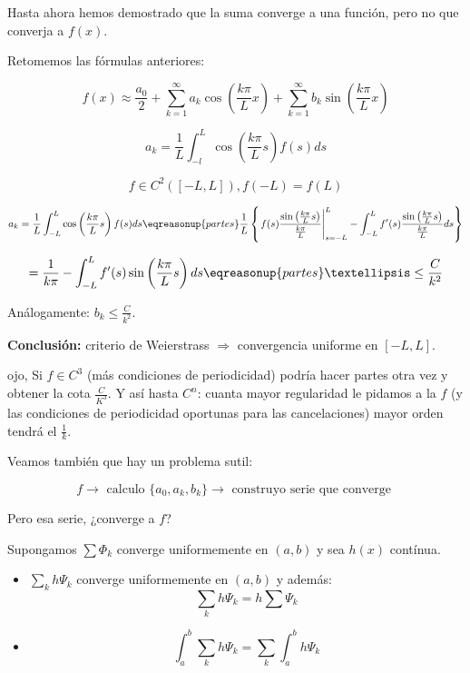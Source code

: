 		\obs Hasta ahora hemos demostrado que la suma converge a una función, pero no que converja a $f(x)$.

		Retomemos las fórmulas anteriores:

		\[ f(x) ≈ \frac{a_0}{2} + \sum_{k=1}^\infty a_k \cos \left( \frac{k \pi}{L} x \right) + \sum_{k=1}^\infty b_k \sin \left( \frac{k \pi}{L} x \right) \]

		\[a_k = \frac{1}{L} \int_{-l}^L \cos \left( \frac{k \pi}{L} s \right) f(s) ds \]

		\[ f \in C^2 ([-L,L]), f(-L) = f(L) \]

		\[a_k = \frac{1}{L} \int^L_{-L} \cos \left( \frac{k \pi}{L} s \right) f(s) ds \eqreasonup{partes} \frac{1}{L} \left\{ \left. f(s) \frac{\sin \left( \frac{k \pi}{L} s \right)}{\frac{k \pi}{L}} \right|_{s=-L}^{L} -  \int^L_{-L} f'(s) \frac{\sin \left( \frac{k \pi}{L} s \right)}{\frac{k \pi}{L}} ds   \right\}  \]

		\[ = \frac{1}{k\pi} -  \int^L_{-L} f'(s) \sin \left( \frac{k \pi}{L} s \right) ds \eqreasonup{partes} … \leq \frac{C}{k^2} \]

		Análogamente: $b_k \leq \frac{C}{k^2}$.


		\textbf{Conclusión:} criterio de Weierstrass $\Rightarrow$ convergencia uniforme en $[-L,L]$.

		\obs ojo, Si $f \in C^3$ (más condiciones de periodicidad) podría hacer partes otra vez y obtener la cota $\frac{C}{K^3}$. Y así hasta $C^n$: cuanta mayor regularidad le pidamos a la $f$ (y las condiciones de periodicidad oportunas para las cancelaciones) mayor orden tendrá el $\frac{1}{k}$.

		Veamos también que hay un problema sutil:

		\[f \rightarrow \text{ calculo } \{a_0,a_k,b_k\} \rightarrow \text{ construyo serie que converge } \]

		Pero esa serie, ¿converge a $f$?

		\begin{lemma}
			Supongamos $\sum \Phi_k$ converge uniformemente en $(a,b)$ y sea $h(x)$ contínua.

			\begin{itemize}
				\item $\sum_k h \Psi_k$ converge uniformemente en $(a,b)$ y además:
				\[ \sum_k h \Psi_k = h \sum \Psi_k\]

				\item \[\int_a^b \sum_k h \Psi_k = \sum_k \int_a^b h \Psi_k \]
			\end{itemize}

		\end{lemma}

